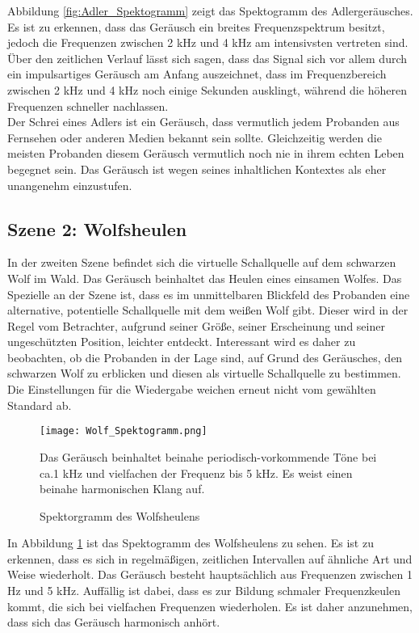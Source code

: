 Abbildung \ref{fig:Adler_Spektogramm} zeigt das Spektogramm des Adlergeräusches. Es ist zu erkennen, dass das Geräusch ein breites Frequenzspektrum besitzt, jedoch die  Frequenzen zwischen 2 kHz und 4 kHz am intensivsten vertreten sind. Über den zeitlichen Verlauf lässt sich sagen, dass das Signal sich vor allem durch ein impulsartiges Geräusch am Anfang auszeichnet, dass im Frequenzbereich zwischen 2 kHz und 4 kHz noch einige Sekunden ausklingt, während die höheren Frequenzen schneller nachlassen.\\

 Der Schrei eines Adlers ist ein Geräusch, dass vermutlich jedem Probanden aus Fernsehen oder anderen Medien bekannt sein sollte. Gleichzeitig werden die meisten Probanden diesem Geräusch vermutlich noch nie in ihrem echten Leben begegnet sein. Das Geräusch ist wegen seines inhaltlichen Kontextes als eher unangenehm einzustufen. 

\newpage
\subsection{Szene 2: Wolfsheulen}

In der zweiten Szene befindet sich die virtuelle Schallquelle auf dem schwarzen Wolf im Wald. Das Geräusch beinhaltet das Heulen eines einsamen Wolfes. Das Spezielle an der Szene ist, dass es im unmittelbaren Blickfeld des Probanden eine alternative, potentielle Schallquelle mit dem weißen Wolf gibt. Dieser wird in der Regel vom Betrachter, aufgrund seiner Größe, seiner Erscheinung und seiner ungeschützten Position, leichter entdeckt. Interessant wird es daher zu beobachten, ob die Probanden in der Lage sind, auf Grund des Geräusches,  den schwarzen Wolf zu erblicken und diesen als virtuelle Schallquelle zu bestimmen.  Die Einstellungen für die Wiedergabe weichen erneut nicht vom gewählten Standard ab. 

 \begin{figure}[H]
\centering
\texttt{[image: Wolf\_Spektogramm.png]}
\caption{Spektorgramm des Wolfsheulens}
Das Geräusch beinhaltet beinahe periodisch-vorkommende Töne bei ca.1 kHz und vielfachen der Frequenz bis 5 kHz. Es weist einen beinahe harmonischen Klang auf. 
\label{fig:Wolf_Spektogramm}
\end{figure} 

In Abbildung \ref{fig:Wolf_Spektogramm} ist das Spektogramm des Wolfsheulens zu sehen. Es ist zu erkennen, dass es sich in regelmäßigen, zeitlichen Intervallen auf ähnliche Art und Weise wiederholt. Das Geräusch besteht hauptsächlich aus Frequenzen zwischen 1 Hz und 5 kHz. Auffällig ist dabei, dass es zur Bildung schmaler Frequenzkeulen kommt, die sich bei vielfachen Frequenzen wiederholen. Es ist daher anzunehmen, dass sich das Geräusch harmonisch anhört. \\

